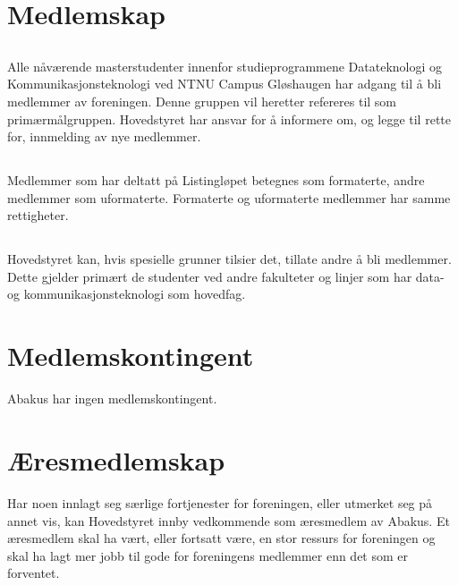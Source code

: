 \section{Medlemskap}

\subsection{}
Alle nåværende masterstudenter innenfor studieprogrammene Datateknologi og Kommunikasjonsteknologi
ved NTNU Campus Gløshaugen har adgang til å bli medlemmer av foreningen. Denne gruppen vil heretter refereres til som primærmålgruppen. Hovedstyret har ansvar
for å informere om, og legge til rette for, innmelding av nye medlemmer.

\subsection{}
Medlemmer som har deltatt på Listingløpet betegnes som formaterte, andre
medlemmer som uformaterte. Formaterte og uformaterte medlemmer har samme
rettigheter.

\subsection{}
Hovedstyret kan, hvis spesielle grunner tilsier det, tillate andre å bli
medlemmer. Dette gjelder primært de studenter ved andre fakulteter og linjer
som har data- og kommunikasjonsteknologi som hovedfag.

\section{Medlemskontingent}
Abakus har ingen medlemskontingent.

\section{Æresmedlemskap}
Har noen innlagt seg særlige fortjenester for foreningen, eller utmerket seg
på annet vis, kan Hovedstyret innby vedkommende som æresmedlem av Abakus. Et
æresmedlem skal ha vært, eller fortsatt være, en stor ressurs for foreningen og
skal ha lagt mer jobb til gode for foreningens medlemmer enn det som er forventet.
